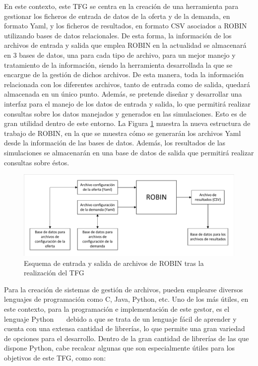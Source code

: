 En este contexto, este \acrshort{TFG} se centra en la creación de una herramienta para gestionar los ficheros de entrada de datos de la oferta y de la demanda, en formato \acrshort{Yaml}, y los ficheros de resultados, en formato \acrshort{CSV} asociados a \acrshort{ROBIN} utilizando bases de datos relacionales. De esta forma, la información de los archivos de entrada y salida que emplea \acrshort{ROBIN} en la actualidad se almacenará en 3 bases de datos, una para cada tipo de archivo, para un mejor manejo y tratamiento de la información, siendo la herramienta desarrollada la que se encargue de la gestión de dichos archivos. De esta manera, toda la información relacionada con los diferentes archivos, tanto de entrada como de salida, quedará almacenada en un único punto. Además, se pretende diseñar y desarrollar una interfaz para el manejo de los datos de entrada y salida, lo que permitirá realizar consultas sobre los datos manejados y generados en las simulaciones. Esto es de gran utilidad dentro de este entorno. La Figura \ref{fig:esquemaROBINConDB} muestra la nueva estructura de trabajo de \acrshort{ROBIN}, en la que se muestra cómo se generarán los archivos \acrshort{Yaml} desde la información de las bases de datos. Además, los resultados de las simulaciones se almacenarán en una base de datos de salida que permitirá realizar consultas sobre éstos.

\begin{figure}[H]
\centering
\includegraphics[trim={0.2cm, 0.4cm, 0.2cm, 0.4cm}, clip, width=.9\textwidth]{fig/Diagramas/Esquema ROBIN con base de datos.pdf}
\caption{Esquema de entrada y salida de archivos de \acrshort{ROBIN} tras la realización del \acrshort{TFG}}
\label{fig:esquemaROBINConDB}
\end{figure}

Para la creación de sistemas de gestión de archivos, pueden emplearse diversos lenguajes de programación como C, Java, Python, etc. Uno de los más útiles, en este contexto, para la programación e implementación de este gestor, es el lenguaje Python~\cite{Python}~\cite{Romano2015}~\cite{VanHattem2016} debido a que se trata de un lenguaje fácil de aprender y cuenta con una extensa cantidad de librerías, lo que permite una gran variedad de opciones para el desarrollo. Dentro de la gran cantidad de librerías de las que dispone Python, cabe recalcar algunas que son especialmente útiles para los objetivos de este TFG, como son: 

